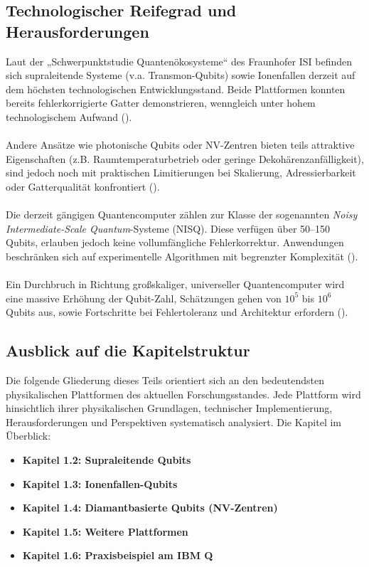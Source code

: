 \subsection{Technologischer Reifegrad und Herausforderungen}
Laut der „Schwerpunktstudie Quantenökosysteme“ des Fraunhofer ISI befinden sich supraleitende Systeme (v.a. Transmon-Qubits) sowie Ionenfallen derzeit auf dem höchsten technologischen Entwicklungsstand. Beide Plattformen konnten bereits fehlerkorrigierte Gatter demonstrieren, wenngleich unter hohem technologischem Aufwand (\cite{schmaltz_quantentechnologien_2025}).
\\\\
Andere Ansätze wie photonische Qubits oder NV-Zentren bieten teils attraktive Eigenschaften (z.B. Raumtemperaturbetrieb oder geringe Dekohärenzanfälligkeit), sind jedoch noch mit praktischen Limitierungen bei Skalierung, Adressierbarkeit oder Gatterqualität konfrontiert (\cite{homeister_quantum_2015}).
\\\\
Die derzeit gängigen Quantencomputer zählen zur Klasse der sogenannten \textit{Noisy Intermediate-Scale Quantum}-Systeme (NISQ). Diese verfügen über 50–150 Qubits, erlauben jedoch keine vollumfängliche Fehlerkorrektur. Anwendungen beschränken sich auf experimentelle Algorithmen mit begrenzter Komplexität (\cite{schmaltz_quantentechnologien_2025, homeister_quantum_2015}).
\\\\
Ein Durchbruch in Richtung großskaliger, universeller Quantencomputer wird eine massive Erhöhung der Qubit-Zahl, Schätzungen gehen von $10^5$ bis $10^6$ Qubits aus, sowie Fortschritte bei Fehlertoleranz und Architektur erfordern (\cite{schmaltz_quantentechnologien_2025}).

\subsection{Ausblick auf die Kapitelstruktur}
Die folgende Gliederung dieses Teils orientiert sich an den bedeutendsten physikalischen Plattformen des aktuellen Forschungsstandes. Jede Plattform wird hinsichtlich ihrer physikalischen Grundlagen, technischer Implementierung, Herausforderungen und Perspektiven systematisch analysiert. Die Kapitel im Überblick:

\begin{itemize}
\item \textbf{Kapitel 1.2: Supraleitende Qubits}
\item \textbf{Kapitel 1.3: Ionenfallen-Qubits}
\item \textbf{Kapitel 1.4: Diamantbasierte Qubits (NV-Zentren)}
\item \textbf{Kapitel 1.5: Weitere Plattformen} 
\item \textbf{Kapitel 1.6: Praxisbeispiel am IBM Q}
\end{itemize}

